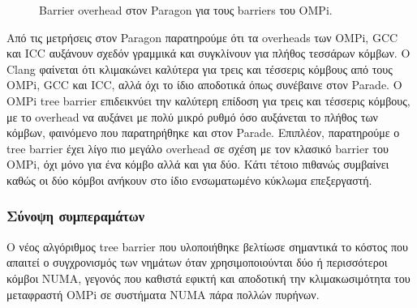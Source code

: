 \begin{figure}
\begin{minipage}{0.48\textwidth}
        \caption{Barrier overhead στον Paragon για τους barriers του OMPi.}
        \label{fig:bo-paragon-default-places-ompionly}
    \end{minipage}
\end{figure}


%
%

Από τις μετρήσεις στον Paragon παρατηρούμε ότι τα overheads των OMPi, GCC και ICC αυξάνουν σχεδόν γραμμικά και συγκλίνουν για πλήθος τεσσάρων κόμβων. Ο Clang φαίνεται ότι κλιμακώνει καλύτερα για τρεις και τέσσερις κόμβους από τους OMPi, GCC και ICC, αλλά όχι το ίδιο αποδοτικά όπως συνέβαινε στον Parade. Ο OMPi tree barrier επιδεικνύει την καλύτερη επίδοση για τρεις και τέσσερις κόμβους, με το overhead να αυξάνει με πολύ μικρό ρυθμό όσο αυξάνεται το πλήθος των κόμβων, φαινόμενο που παρατηρήθηκε και στον Parade. Επιπλέον, παρατηρούμε ο tree barrier έχει λίγο πιο μεγάλο overhead σε σχέση με τον κλασικό barrier του OMPi, όχι μόνο για ένα κόμβο αλλά και για δύο. Κάτι τέτοιο πιθανώς συμβαίνει καθώς οι δύο κόμβοι ανήκουν στο ίδιο ενσωματωμένο κύκλωμα επεξεργαστή.


\subsubsection{Σύνοψη συμπεραμάτων}
Ο νέος αλγόριθμος tree barrier που υλοποιήθηκε βελτίωσε σημαντικά το κόστος που απαιτεί ο συγχρονισμός των νημάτων όταν χρησιμοποιούνται δύο ή περισσότεροι κόμβοι NUMA, γεγονός που καθιστά εφικτή και αποδοτική την κλιμακωσιμότητα του μεταφραστή OMPi σε συστήματα NUMA πάρα πολλών πυρήνων.

